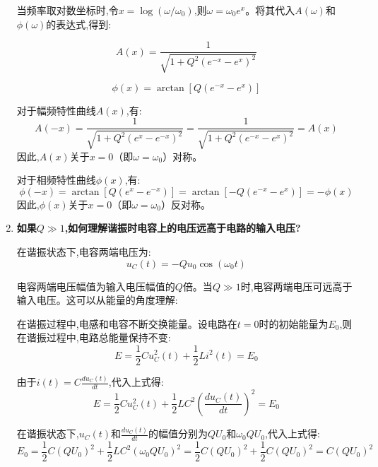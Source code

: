 \documentclass[UTF8]{ctexart}
\begin{document}
\begin{enumerate}
当频率取对数坐标时,令$x=\log(\omega/\omega_0)$,则$\omega=\omega_0e^x$。将其代入$A(\omega)$和$\phi(\omega)$的表达式,得到:

\begin{equation}
A(x) = \frac{1}{\sqrt{1 + Q^2(e^{-x} - e^x)^2}}
\end{equation}

\begin{equation}
\phi(x) = \arctan\left[Q\left(e^{-x} - e^x\right)\right]
\end{equation}

对于幅频特性曲线$A(x)$,有:
\begin{equation}
A(-x) = \frac{1}{\sqrt{1 + Q^2(e^x - e^{-x})^2}} = \frac{1}{\sqrt{1 + Q^2(e^{-x} - e^x)^2}} = A(x)
\end{equation}
因此,$A(x)$关于$x=0$（即$\omega=\omega_0$）对称。

对于相频特性曲线$\phi(x)$,有:
\begin{equation}
\phi(-x) = \arctan\left[Q\left(e^x - e^{-x}\right)\right] = \arctan\left[-Q\left(e^{-x} - e^x\right)\right] = -\phi(x)
\end{equation}
因此,$\phi(x)$关于$x=0$（即$\omega=\omega_0$）反对称。
    
    \item \textbf{如果$Q\gg1$,如何理解谐振时电容上的电压远高于电路的输入电压?}
    
    在谐振状态下,电容两端电压为:
\begin{equation}
u_C(t) = -Q u_0 \cos(\omega_0 t)
\end{equation}

电容两端电压幅值为输入电压幅值的$Q$倍。当$Q\gg1$时,电容两端电压可远高于输入电压。这可以从能量的角度理解:

在谐振过程中,电感和电容不断交换能量。设电路在$t=0$时的初始能量为$E_0$,则在谐振过程中,电路总能量保持不变:
\begin{equation}
E = \frac{1}{2}C u_C^2(t) + \frac{1}{2}L i^2(t) = E_0
\end{equation}

由于$i(t)=C\frac{du_C(t)}{dt}$,代入上式得:
\begin{equation}
E = \frac{1}{2}C u_C^2(t) + \frac{1}{2}LC^2 \left(\frac{du_C(t)}{dt}\right)^2 = E_0
\end{equation}

在谐振状态下,$u_C(t)$和$\frac{du_C(t)}{dt}$的幅值分别为$QU_0$和$\omega_0 QU_0$,代入上式得:
\begin{equation}
E_0 = \frac{1}{2}C(QU_0)^2 + \frac{1}{2}LC^2(\omega_0 QU_0)^2 = \frac{1}{2}C(QU_0)^2 + \frac{1}{2}C(QU_0)^2 = C(QU_0)^2
\end{equation}


\end{enumerate}
\end{document}
